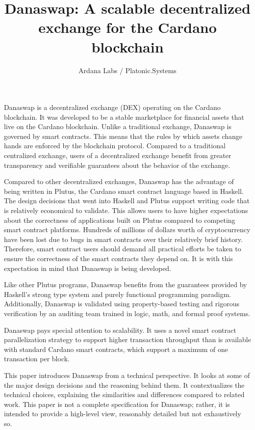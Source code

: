 \documentclass[12pt]{article}
\title{Danaswap: A scalable decentralized exchange for the Cardano blockchain}
\author{Ardana Labs / Platonic.Systems}
\begin{document}
\maketitle


Danaswap is a decentralized exchange (DEX) operating on the Cardano blockchain. It was developed to be a stable marketplace for financial assets that live on the Cardano blockchain. Unlike a traditional exchange, Danaswap is governed by smart contracts. This means that the rules by which assets change hands are enforced by the blockchain protocol. Compared to a traditional centralized exchange, users of a decentralized exchange benefit from greater transparency and verifiable guarantees about the behavior of the exchange.

Compared to other decentralized exchanges, Danaswap has the advantage of being written in Plutus, the Cardano smart contract language based in Haskell. The design decisions that went into Haskell and Plutus support writing code that is relatively economical to validate. This allows users to have higher expectations about the correctness of applications built on Plutus compared to competing smart contract platforms. Hundreds of millions of dollars worth of cryptocurrency have been lost due to bugs in smart contracts over their relatively brief history. \cite{guardian2017,cryptobriefing2020} Therefore, smart contract users should demand all practical efforts be taken to ensure the correctness of the smart contracts they depend on. It is with this expectation in mind that Danaswap is being developed.

Like other Plutus programs, Danaswap benefits from the guarantees provided by Haskell's strong type system and purely functional programming paradigm. Additionally, Danaswap is validated using property-based testing and rigorous verification by an auditing team trained in logic, math, and formal proof systems.

Danaswap pays special attention to scalability. It uses a novel smart contract parallelization strategy to support higher transaction throughput than is available with standard Cardano smart contracts, which support a maximum of one transaction per block.

This paper introduces Danaswap from a technical perspective. It looks at some of the major design decisions and the reasoning behind them. It contextualizes the technical choices, explaining the similarities and differences compared to related work. This paper is not a complete specification for Danaswap; rather, it is intended to provide a high-level view, reasonably detailed but not exhaustively so.
\end{document}
